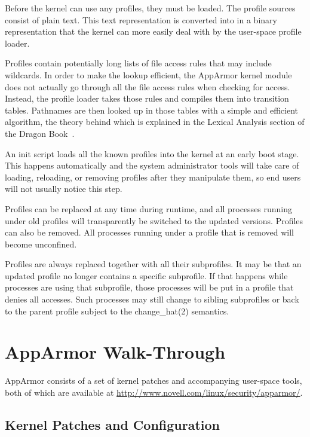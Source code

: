 \documentclass[a4paper]{article}
\begin{document}
Before the kernel can use any profiles, they must be loaded.  The
profile sources consist of plain text.  This text representation is
converted into in a binary representation that the kernel can more
easily deal with by the user-space profile loader.

Profiles contain potentially long lists of file access rules that may
include wildcards.  In order to make the lookup efficient, the AppArmor
kernel module does not actually go through all the file access rules
when checking for access.  Instead, the profile loader takes those rules
and compiles them into transition tables.  Pathnames are then looked up
in those tables with a simple and efficient algorithm, the theory behind
which is explained in the Lexical Analysis section of the Dragon
Book~\cite{dragon86}.

An init script loads all the known profiles into the kernel at an early
boot stage.  This happens automatically and the system administrator
tools will take care of loading, reloading, or removing profiles after
they manipulate them, so end users will not usually notice this step.

Profiles can be replaced at any time during runtime, and all processes
running under old profiles will transparently be switched to the updated
versions.  Profiles can also be removed.  All processes running under a
profile that is removed will become unconfined.

Profiles are always replaced together with all their subprofiles.  It
may be that an updated profile no longer contains a specific subprofile.
If that happens while processes are using that subprofile, those
processes will be put in a profile that denies all accesses.  Such
processes may still change to sibling subprofiles or back to the parent
profile subject to the change\_hat(2) semantics.


\section{AppArmor Walk-Through}
\label{sec:walk-through}

AppArmor consists of a set of kernel patches and accompanying
user-space tools, both of which are available at
\url{http://www.novell.com/linux/security/apparmor/}.


\subsection{Kernel Patches and Configuration}
\end{document}
